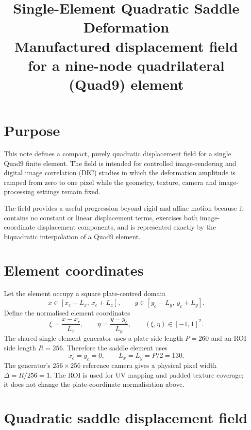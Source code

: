 \documentclass[11pt,a4paper]{article}
\title{\textbf{Single-Element Quadratic Saddle Deformation}\\
\large Manufactured displacement field for a nine-node quadrilateral (Quad9) element}
\author{}
\date{}
\begin{document}
\maketitle

\section{Purpose}

This note defines a compact, purely quadratic displacement field for a single Quad9 finite element. The field is intended for controlled image-rendering and digital image correlation (DIC) studies in which the deformation amplitude is ramped from zero to one pixel while the geometry, texture, camera and image-processing settings remain fixed.

The field provides a useful progression beyond rigid and affine motion because it contains no constant or linear displacement terms, exercises both image-coordinate displacement components, and is represented exactly by the biquadratic interpolation of a Quad9 element.

\section{Element coordinates}

Let the element occupy a square plate-centred domain
\begin{equation}
  x\in[x_c-L_x,\,x_c+L_x],
  \qquad
  y\in[y_c-L_y,\,y_c+L_y].
\end{equation}
Define the normalised element coordinates
\begin{equation}
  \xi=\frac{x-x_c}{L_x},
  \qquad
  \eta=\frac{y-y_c}{L_y},
  \qquad
  (\xi,\eta)\in[-1,1]^2.
\end{equation}
The shared single-element generator uses a plate side length $P=260$ and an
ROI side length $R=256$.  Therefore the saddle element uses
\begin{equation}
  x_c=y_c=0,
  \qquad
  L_x=L_y=P/2=130.
\end{equation}
The generator's $256\times256$ reference camera gives a physical pixel width
$\Delta=R/256=1$.  The ROI is used for UV mapping and padded texture coverage;
it does not change the plate-coordinate normalisation above.

\section{Quadratic saddle displacement field}
\end{document}
